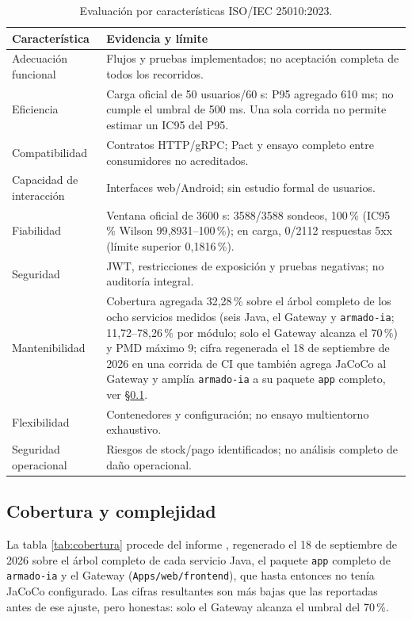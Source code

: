 \documentclass[12pt,a4paper]{article}
\begin{document}
\begin{table}[H]\centering\small
\caption{Evaluación por características ISO/IEC 25010:2023.}\label{tab:iso}
\begin{tabularx}{\textwidth}{lX}
\toprule Característica & Evidencia y límite\\\midrule
Adecuación funcional & Flujos y pruebas implementados; no aceptación completa de todos los recorridos.\\
Eficiencia & Carga oficial de 50 usuarios/60 s: P95 agregado 610 ms; no cumple el umbral de 500 ms. Una sola corrida no permite estimar un IC95 del P95.\\
Compatibilidad & Contratos HTTP/gRPC; Pact y ensayo completo entre consumidores no acreditados.\\
Capacidad de interacción & Interfaces web/Android; sin estudio formal de usuarios.\\
Fiabilidad & Ventana oficial de 3600 s: 3588/3588 sondeos, 100\,\% (IC95\,\% Wilson 99{,}8931--100\,\%); en carga, 0/2112 respuestas 5xx (límite superior 0{,}1816\,\%).\\
Seguridad & JWT, restricciones de exposición y pruebas negativas; no auditoría integral.\\
Mantenibilidad & Cobertura agregada 32{,}28\,\% sobre el árbol completo de los ocho servicios medidos (seis Java, el Gateway y \texttt{armado-ia}; 11{,}72--78{,}26\,\% por módulo; solo el Gateway alcanza el 70\,\%) y PMD máximo 9; cifra regenerada el 18 de septiembre de 2026 en una corrida de CI que también agrega JaCoCo al Gateway y amplía \texttt{armado-ia} a su paquete \texttt{app} completo, ver §\ref{sec:cobertura-complejidad}.\\
Flexibilidad & Contenedores y configuración; no ensayo multientorno exhaustivo.\\
Seguridad operacional & Riesgos de stock/pago identificados; no análisis completo de daño operacional.\\\bottomrule
\end{tabularx}
\end{table}

\subsection{Cobertura y complejidad}\label{sec:cobertura-complejidad}
La tabla \ref{tab:cobertura} procede del informe , regenerado el 18 de septiembre de 2026 sobre el árbol completo de cada servicio Java, el paquete \texttt{app} completo de \texttt{armado-ia} y el Gateway (\texttt{Apps/web/frontend}), que hasta entonces no tenía JaCoCo configurado. Las cifras resultantes son más bajas que las reportadas antes de ese ajuste, pero honestas: solo el Gateway alcanza el umbral del 70\,\%.
\end{document}
